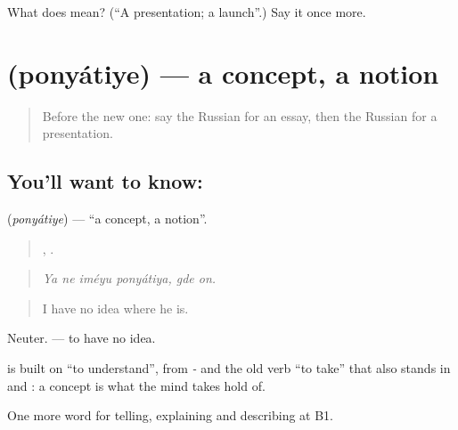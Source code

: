 \begin{tcolorbox}[breakable,colback=teal!4,colframe=teal!35!black,title={Before you move on}]
What does  mean? (\textquotedblleft{}A presentation; a launch\textquotedblright{}.) Say it once more.
\end{tcolorbox}
\section[\texorpdfstring{\ru{понятие} (ponyátiye)}{понятие (ponyátiye)}]{ (ponyátiye) — a concept, a notion}

\label{lesson:RU-C386-ponyatie}



\begin{quote}
Before the new one: say the Russian for an essay, then the Russian for a presentation.
\end{quote}

\subsection*{You'll want to know: }
\textbf{} (\emph{ponyátiye}) — \textquotedblleft{}a concept, a notion\textquotedblright{}.

\begin{quote}
   ,  .
\end{quote}

\begin{quote}
\emph{Ya ne iméyu ponyátiya, gde on.}
\end{quote}

\begin{quote}
I have no idea where he is.
\end{quote}

Neuter. \emph{  } — to have no idea.

\begin{cousinweb}
\textbf{} is built on \emph{} \textquotedblleft{}to understand\textquotedblright{}, from \emph{-} and the old verb \textquotedblleft{}to take\textquotedblright{} that also stands in \emph{} and \emph{}: a concept is what the mind takes hold of.
\end{cousinweb}

\begin{grammarlens}[title={What you've built}]
One more word for telling, explaining and describing at B1.
\end{grammarlens}

